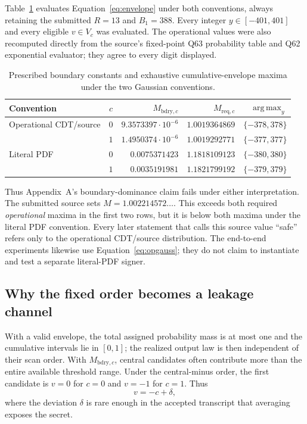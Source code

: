 \documentclass[11pt,a4paper]{article}
\begin{document}
Table~\ref{tab:envelope} evaluates Equation~\eqref{eq:envelope} under both
conventions, always retaining the submitted $R=13$ and $B_1=388$.  Every
integer $y\in[-401,401]$ and every eligible $v\in V_c$ was evaluated.  The
operational values were also recomputed directly from the source's fixed-point
Q63 probability table and Q62 exponential evaluator; they agree to every
digit displayed.

\begin{table}[t]
\centering
\small
\caption{Prescribed boundary constants and exhaustive cumulative-envelope
maxima under the two Gaussian conventions.}
\label{tab:envelope}
\begin{tabular}{@{}lcrrr@{}}
\toprule
Convention & $c$ & $M_{\mathrm{bdry},c}$ & $M_{\mathrm{req},c}$
    & $\operatorname*{arg\,max}_y$\\
\midrule
Operational CDT/source
 & $0$ & $9.3573397\cdot10^{-6}$ & $1.0019364869$ & $\{-378,378\}$\\
 & $1$ & $1.4950374\cdot10^{-6}$ & $1.0019292771$ & $\{-377,377\}$\\
\addlinespace
Literal PDF
 & $0$ & $0.0075371423$ & $1.1818109123$ & $\{-380,380\}$\\
 & $1$ & $0.0035191981$ & $1.1821799192$ & $\{-379,379\}$\\
\bottomrule
\end{tabular}
\end{table}

Thus Appendix~A's boundary-dominance claim fails under either interpretation.
The submitted source sets $M=1.002214572\ldots$.  This exceeds both required
\emph{operational} maxima in the first two rows, but it is below both maxima
under the literal PDF convention.  Every later statement that calls this
source value ``safe'' refers only to the operational CDT/source distribution.
The end-to-end experiments likewise use Equation~\eqref{eq:opgauss}; they do
not claim to instantiate and test a separate literal-PDF signer.

\subsection{Why the fixed order becomes a leakage channel}

With a valid envelope, the total assigned probability mass is at most one and
the cumulative intervals lie in $[0,1]$; the realized output law is then
independent of their scan order.  With $M_{\mathrm{bdry},c}$, central
candidates often contribute more than the entire available threshold range.
Under the central-minus order, the first candidate is $v=0$ for $c=0$ and
$v=-1$ for $c=1$.  Thus
\begin{equation}
                             v=-c+\delta,              \label{eq:delta}
\end{equation}
where the deviation $\delta$ is rare enough in the accepted transcript that
averaging exposes the secret.
\end{document}
